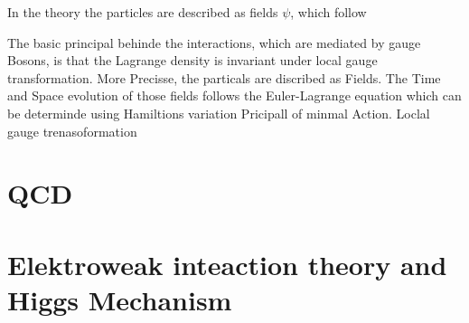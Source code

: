 In the theory the particles are described as fields $\psi$, which follow 

\noindent The basic principal behinde the interactions, which are mediated by gauge Bosons, is  that the Lagrange density is invariant under local gauge transformation. More Precisse, the particals are discribed as Fields. The Time and Space evolution of those fields follows the Euler-Lagrange equation which can be determinde using Hamiltions variation Pricipall of minmal Action. 
Loclal gauge trenasoformation


\clearpage

\clearpage


\section{QCD}


\clearpage
\section{Elektroweak inteaction theory and Higgs Mechanism}


\clearpage